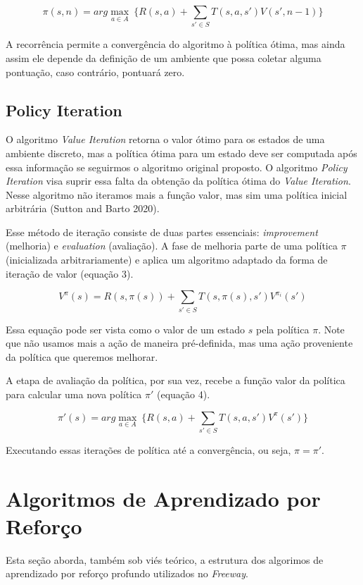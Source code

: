 \documentclass[letterpaper]{article} %
\begin{document}
\begin{equation}
\pi(s, n) = arg \max_{a \in A} \ \{ R(s,a) + \sum_{s' \in S} T(s,a,s')  V(s', n-1)\}
\end{equation}


A recorrência permite a convergência do algoritmo à política ótima, mas ainda assim ele depende da definição de um ambiente que possa coletar alguma pontuação, caso contrário, pontuará zero. 

\subsection{Policy Iteration}
O algoritmo \textit{Value Iteration} retorna o valor ótimo para os estados de uma ambiente discreto, mas a política ótima para um estado deve ser computada após essa informação se seguirmos o algoritmo original proposto. O algoritmo \textit{Policy Iteration} visa suprir essa falta da obtenção da política ótima do \textit{Value Iteration}. Nesse algoritmo não iteramos mais a função valor, mas sim uma política inicial arbitrária (Sutton and Barto 2020).

Esse método de iteração consiste de duas partes essenciais: \textit{improvement} (melhoria) e \textit{evaluation} (avaliação). A fase de melhoria parte de uma política $\pi$ (inicializada arbitrariamente) e aplica um algoritmo adaptado da forma de iteração de valor (equação 3).

\begin{equation}
V^{\pi}(s) = R(s,\pi(s)) + \sum_{s' \in S} T(s,\pi(s),s')  V^{\pi_i}(s')
\end{equation}

Essa equação pode ser vista como o valor de um estado $s$ pela política $\pi$. Note que não usamos mais a ação de maneira pré-definida, mas uma ação proveniente da política que queremos melhorar.

A etapa de avaliação da política, por sua vez, recebe a função valor da política para calcular uma nova política $\pi'$ (equação 4).

\begin{equation}
\pi'(s) = arg \max_{a \in A} \ \{ R(s,a) + \sum_{s' \in S} T(s,a,s')  V^{\pi}(s')\}
\end{equation}

Executando essas iterações de política até a convergência, ou seja, $\pi = \pi'$. 

\section{Algoritmos de Aprendizado por Reforço}
Esta seção aborda, também sob viés teórico, a estrutura dos algorimos de aprendizado por reforço profundo utilizados no \textit{Freeway}.
\end{document}
